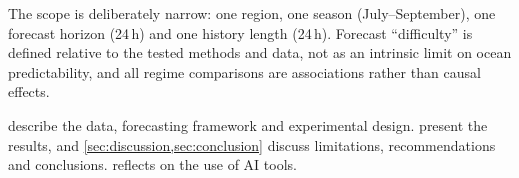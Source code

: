 The scope is deliberately narrow: one region, one season (July--September), one forecast horizon (24\,h) and one history length (24\,h). Forecast ``difficulty'' is defined relative to the tested methods and data, not as an intrinsic limit on ocean predictability, and all regime comparisons are associations rather than causal effects.

 describe the data, forecasting framework and experimental design.  present the results, and \cref{sec:discussion,sec:conclusion} discuss limitations, recommendations and conclusions.  reflects on the use of AI tools.
